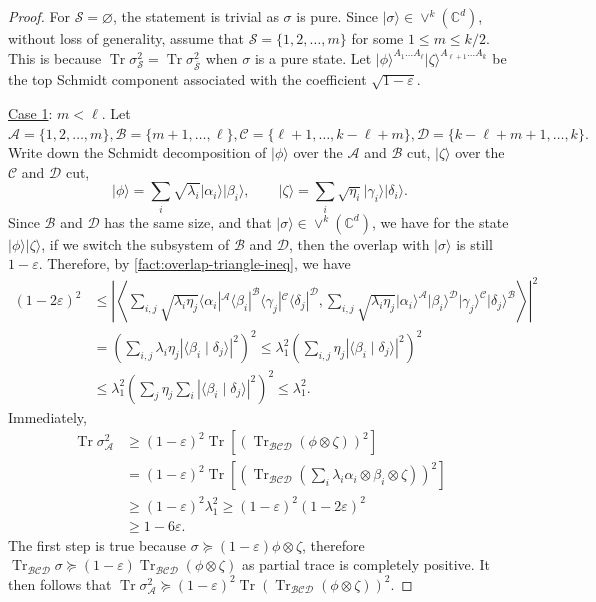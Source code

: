 \documentclass[10pt,a4paper]{article}
\theoremstyle{remark}
\def\epsilon{\varepsilon}
\renewcommand{\bar}{\overline}
\newcommand{\C}{{\mathbb C}}
\newcommand{\cA}{\mathcal{A}}
\newcommand{\cB}{\mathcal{B}}
\newcommand{\cC}{\mathcal{C}}
\newcommand{\cD}{\mathcal{D}}
\newcommand{\cS}{\mathcal{S}}
\renewcommand{\bar}[1]{\ensuremath{\overline{#1}}}
\newcommand{\1}[1]{\mathds{1}{[#1]}}
\newcommand{\ket}[1]{\lvert #1\rangle}
\newcommand{\Symm}[2]{\vee^{#1}(\C^{#2})}
\newcommand{\trace}{\operatorname{Tr}}
\newcommand{\bra}[1]{\langle#1|}
\numberwithin{equation}{section}
\newcommand{\pnote}[1]{\textcolor{olive}{{\textbf{Pei: #1}}}}
\begin{document}
\begin{proof}
For $\cS =\varnothing$, the statement is trivial as $\sigma$ is pure. Since $\ket\sigma\in\Symm{k}{d}$, without loss of generality, assume that 
$\cS=\{1, 2, \ldots, m\}$ for some $1 \le m \le k/2$. This is because 
$\trace \sigma_\cS^2 = \trace \sigma^2_{\bar\cS}$ when $\sigma$ is a pure state. Let $\ket\phi ^{A_1\ldots A_\ell} \ket\zeta ^{A_{\ell+1}\ldots A_k}$ be the 
top Schmidt component associated with the coefficient $\sqrt{1-\epsilon}$. 


\uline{Case 1}: $m < \ell$. Let $\cA = \{1, 2, \ldots, m\}, \cB = \{m+1, \ldots, \ell\}, \cC = \{\ell+1, \ldots, k-\ell+m \}, \cD = \{k-\ell+m+1, \ldots, k\}.$ Write down the Schmidt decomposition of $\ket\phi$ over the $\cA$ and $\cB$ cut, $\ket\zeta$ over the $\cC$ and $\cD$ cut,
\begin{equation}
    \ket\phi = \sum_i \sqrt{\lambda_i} \ket{\alpha_i}\ket{\beta_i}, 
    \qquad
    \ket\zeta = \sum_i \sqrt{\eta_i} \ket{\gamma_i} \ket{\delta_i}.
    \nonumber
\end{equation}
Since $\cB$ and $\cD$ has the same size, and that $\ket\sigma\in\Symm{k}{d}$, we have for the state $\ket\phi\ket\zeta$, if we switch the subsystem of $\cB$ and $\cD$, then the overlap with $\ket\sigma$ is still $1-\epsilon$. Therefore, by \cref{fact:overlap-triangle-ineq}, we have
\begin{align}
    (1-2\epsilon)^2 
    &\le \left|\left\langle
        \sum_{i,j} \sqrt{\lambda_i\eta_j}\bra{\alpha_i}^\cA\bra{\beta_i}^\cB
         \bra{\gamma_j}^\cC\bra{\delta_j}^\cD,
        \sum_{i,j} \sqrt{\lambda_i\eta_j}\ket{\alpha_i}^\cA\ket{\beta_i}^\cD
        \ket{\gamma_j}^\cC\ket{\delta_j}^\cB
    \right\rangle\right|^2
    \nonumber \\
    & = \left(\sum_{i,j} \lambda_i\eta_j |\langle \beta_i \mid \delta_j \rangle|^2\right)^2
    \le  \lambda_1^2 \left(  \sum_{i,j}\eta_j |\langle \beta_i \mid \delta_j \rangle|^2 \right) ^2
    \nonumber\\
    &\le \lambda_1^2 \left(  \sum_{j}\eta_j \sum_i|\langle \beta_i \mid \delta_j \rangle|^2 \right)^2
    \le \lambda_1 ^2.
    \nonumber
\end{align}
Immediately,
\begin{align}
    \trace{\sigma_\cA ^2 } 
    &\ge (1-\epsilon)^2\trace [(\trace_{\cB\cC\cD}  (\phi\otimes\zeta) )^2]
    \nonumber \\
    &= (1-\epsilon)^2\trace \left[\left(\trace_{\cB\cC\cD} \left(
    \sum_i \lambda_i \alpha_i \otimes \beta_i\otimes\zeta
    \right) \right) ^2\right]
    \nonumber \\
    &\ge (1-\epsilon)^2 \lambda_1 ^2 \ge (1-\epsilon)^2 (1-2\epsilon)^2
    \nonumber\\
    &\ge 1-6\epsilon.\label{eq:many-many-case1-corr}
\end{align} 
The first step is true because $\sigma \succeq (1-\epsilon)\phi\otimes \zeta$, therefore  $\trace_{\cB\cC\cD}\sigma \succeq (1-\epsilon)\trace_{\cB\cC\cD}(\phi\otimes \zeta)$ as partial trace is completely positive. It then follows that $\trace\sigma_\cA ^2 \succeq (1-\epsilon)^2\trace(\trace_{\cB\cC\cD}(\phi\otimes\zeta)) ^2$.

\end{proof}
\end{document}
